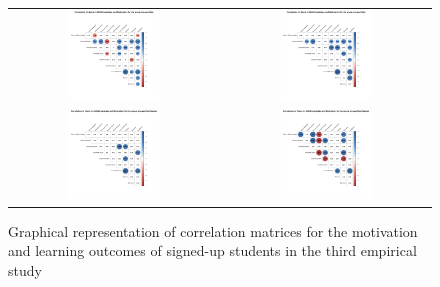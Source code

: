 \begin{figure}[htb]
 \caption{Graphical representation of correlation matrices for the motivation and learning outcomes of signed-up students in the third empirical study}
 \label{fig:signedup-correlation-matrices-third-study}
 \centering
 \begin{tabular}{cc}
 \includegraphics[width=0.45\textwidth]{images/chap-evaluation/corr-signedup-third/wo-gamified1.png}&
 \includegraphics[width=0.45\textwidth]{images/chap-evaluation/corr-signedup-third/ont-gamified1.png}\\
 \includegraphics[width=0.45\textwidth]{images/chap-evaluation/corr-signedup-third/wo-gamifiedMaster1.png}&
 \includegraphics[width=0.45\textwidth]{images/chap-evaluation/corr-signedup-third/ont-gamifiedMaster1.png}\\

\end{tabular}
\end{figure}
